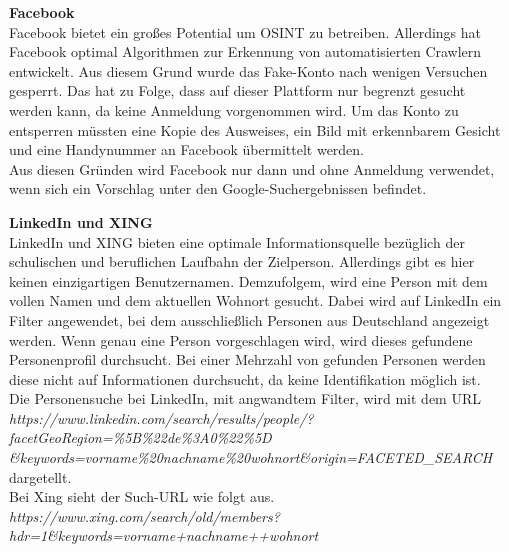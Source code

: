 			\textbf{Facebook}\\
			Facebook bietet ein großes Potential um OSINT zu betreiben. Allerdings hat Facebook optimal Algorithmen zur Erkennung von automatisierten Crawlern entwickelt. Aus diesem Grund wurde das Fake-Konto nach wenigen Versuchen gesperrt. Das hat zu Folge, dass auf dieser Plattform nur begrenzt gesucht werden kann, da keine Anmeldung vorgenommen wird. Um das Konto zu entsperren müssten eine Kopie des Ausweises, ein Bild mit erkennbarem Gesicht und eine Handynummer an Facebook übermittelt werden.\\
			Aus diesen Gründen wird Facebook nur dann und ohne Anmeldung verwendet, wenn sich ein Vorschlag unter den Google-Suchergebnissen befindet.

			\textbf{LinkedIn und XING}\\
			LinkedIn und XING bieten eine optimale Informationsquelle bezüglich der schulischen und beruflichen Laufbahn der Zielperson. Allerdings gibt es hier keinen einzigartigen Benutzernamen. Demzufolgem, wird eine Person mit dem vollen Namen und dem aktuellen Wohnort gesucht. Dabei wird auf LinkedIn ein Filter angewendet, bei dem ausschließlich Personen aus Deutschland angezeigt werden. Wenn genau eine Person vorgeschlagen wird, wird dieses gefundene Personenprofil durchsucht. Bei einer Mehrzahl von gefunden Personen werden diese nicht auf Informationen durchsucht, da keine Identifikation möglich ist.\\
			Die Personensuche bei LinkedIn, mit angwandtem Filter, wird mit dem URL\\ \textit{https://www.linkedin.com/search/results/people/?facetGeoRegion=\%5B\%22de\%3A0\%22\%5D\\
				\&keywords=vorname\%20nachname\%20wohnort\&origin=FACETED\_SEARCH} dargetellt. \\
			Bei Xing sieht der Such-URL wie folgt aus.\\			
			\textit{https://www.xing.com/search/old/members?hdr=1\&keywords=vorname+nachname++wohnort}
			
			
